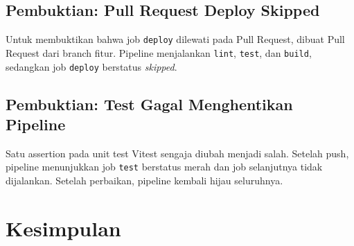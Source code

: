 \documentclass[a4paper,oneside,11pt]{book}
\begin{document}

\section{Pembuktian: Pull Request Deploy Skipped}

Untuk membuktikan bahwa job \texttt{deploy} dilewati pada Pull Request, dibuat Pull Request dari branch fitur. Pipeline menjalankan \texttt{lint}, \texttt{test}, dan \texttt{build}, sedangkan job \texttt{deploy} berstatus \textit{skipped}.


\section{Pembuktian: Test Gagal Menghentikan Pipeline}

Satu assertion pada unit test Vitest sengaja diubah menjadi salah. Setelah push, pipeline menunjukkan job \texttt{test} berstatus merah dan job selanjutnya tidak dijalankan. Setelah perbaikan, pipeline kembali hijau seluruhnya.



\chapter{Kesimpulan}
\end{document}

